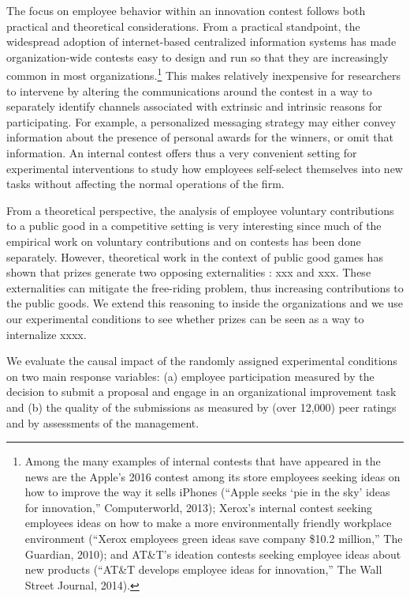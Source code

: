 \documentclass[11pt, titlepage]{article}
\begin{document}
The focus on employee behavior within an innovation contest follows both
practical and theoretical considerations. From a practical standpoint,
the widespread adoption of internet-based centralized information
systems has made organization-wide contests easy to design and run so
that they are increasingly common in most organizations.\footnote{Among
  the many examples of internal contests that have appeared in the news
  are the Apple's 2016 contest among its store employees seeking ideas
  on how to improve the way it sells iPhones (``Apple seeks `pie in the
  sky' ideas for innovation,'' Computerworld, 2013); Xerox's internal
  contest seeking employees ideas on how to make a more environmentally
  friendly workplace environment (``Xerox employees green ideas save
  company \$10.2 million,'' The Guardian, 2010); and AT\&T's ideation
  contests seeking employee ideas about new products (``AT\&T develops
  employee ideas for innovation,'' The Wall Street Journal, 2014).} This
makes relatively inexpensive for researchers to intervene by altering
the communications around the contest in a way to separately identify
channels associated with extrinsic and intrinsic reasons for
participating. For example, a personalized messaging strategy may either
convey information about the presence of personal awards for the
winners, or omit that information. An internal contest offers thus a
very convenient setting for experimental interventions to study how
employees self-select themselves into new tasks without affecting the
normal operations of the firm.

From a theoretical perspective, the analysis of employee voluntary
contributions to a public good in a competitive setting is very
interesting since much of the empirical work on voluntary contributions
and on contests has been done separately. However, theoretical work in
the context of public good games has shown that prizes generate two
opposing externalities : xxx and xxx. These externalities can mitigate
the free-riding problem, thus increasing contributions to the public
goods. We extend this reasoning to inside the organizations and we use
our experimental conditions to see whether prizes can be seen as a way
to internalize xxxx.

We evaluate the causal impact of the randomly assigned experimental
conditions on two main response variables: (a) employee participation
measured by the decision to submit a proposal and engage in an
organizational improvement task and (b) the quality of the submissions
as measured by (over 12,000) peer ratings and by assessments of the
management.
\end{document}
